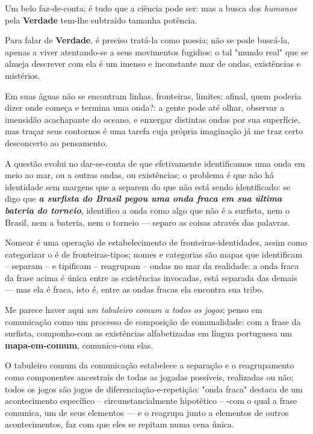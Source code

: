 Um belo faz-de-conta;
    é tudo que a ciência pode ser:
        mas a busca dos \textit{humanos} pela \textbf{Verdade} tem-lhe subtraído tamanha potência.

Para falar de \textbf{Verdade}, é preciso tratá-la como poesia;
    não se pode buscá-la, apenas a viver atentando-se a seus movimentos fugidios:
        o tal "mundo real" que se almeja descrever com ela é um imenso e inconstante mar de ondas, existências e mistérios.

Em suas águas não se encontram linhas, fronteiras, limites;
    afinal, quem poderia dizer onde começa e termina uma onda?:
        a gente pode até olhar, observar a imensidão acachapante do oceano, e enxergar distintas ondas por sua superfície, mas traçar seus contornos é uma tarefa cuja própria imaginação já me traz certo desconcerto ao pensamento.

A questão evolui no dar-se-conta de que efetivamente identificamos uma onda em meio ao mar, ou a outras ondas, ou existências;
    o problema é que não há identidade sem margens que a separem do que não está sendo identificado:
        se digo que \textbf{\textit{a surfista do Brasil pegou uma onda fraca em sua última bateria do torneio}}, identifico a onda como algo que não é a surfista, nem o Brasil, nem a bateria, nem o torneio --- separo as coisas através das palavras.

Nomear é uma operação de estabelecimento de fronteiras-identidades, assim como categorizar o é de fronteiras-tipos;
    nomes e categorias são mapas que identificam -- separam -- e tipificam -- reagrupam -- ondas no mar da realidade:
        a onda fraca da frase acima é única entre as existências invocadas, está separada das demais --- mas ela é fraca, isto é, entre as ondas fracas ela encontra sua tribo.

Me parece haver aqui \textit{um tabuleiro comum a todos os jogos};
    penso em comunicação como um processo de composição de comunalidade:
        com a frase da surfista, componho-com as existências alfabetizadas em língua portuguesa um \textbf{mapa-em-comum}, comunico-com elas.

O tabuleiro comum da comunicação estabelece a separação e o reagrupamento como componentes ancestrais de todas as jogadas possíveis, realizadas ou não;
    todos os jogos são jogos de diferenciação-e-repetição:
        "onda fraca" destaca de um acontecimento específico -- circunstancialmente hipotético -- -com o qual a frase comunica, um de seus elementos --- e o reagrupa junto a elementos de outros acontecimentos, faz com que eles se repitam numa cena única.

